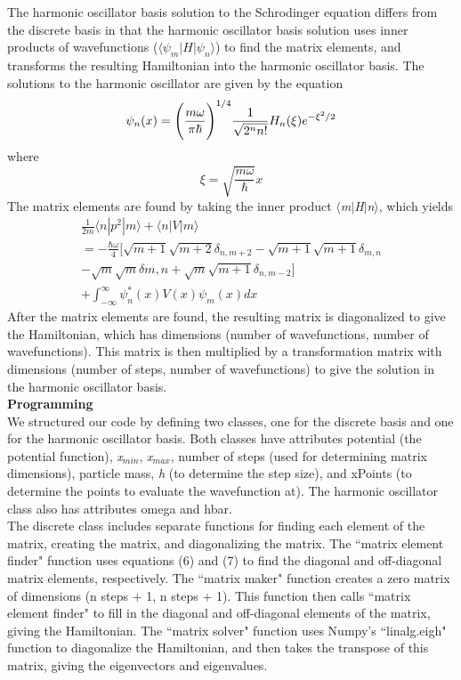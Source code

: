 \documentclass[%
 reprint,
 amsmath,amssymb,
 aps,
]{revtex4-1}
\begin{document}
\noindent The harmonic oscillator basis solution to the Schrodinger equation differs from the discrete basis in that the harmonic oscillator basis solution uses inner products of wavefunctions ($\langle\psi_m|H|\psi_n\rangle$) to find the matrix elements, and transforms the resulting Hamiltonian into the harmonic oscillator basis.  The solutions to the harmonic oscillator are given by the equation
\begin{equation}
\psi_n(x)=\Bigg{(}\frac{m\omega}{\pi\hbar}\Bigg{)}^{1/4}\frac{1}{\sqrt{2^n n!}}H_n(\xi)e^{-\xi^2/2}
\end{equation}
\noindent where
\begin{equation}
\xi=\sqrt{\frac{m\omega}{\hbar}}x
\end{equation}
The matrix elements are found by taking the inner product $\langle$\textit{m}$|$\textit{H}$|$\textit{n}$\rangle$, which yields
\begin{multline}
\frac{1}{2m}\langle n|p^2|m \rangle + \langle n|V|m \rangle \\
=-\frac{\hbar\omega}{4}[\sqrt{m+1}\sqrt{m+2}\delta_{n,m+2}-\sqrt{m+1}\sqrt{m+1}\delta_{m,n}\\
-\sqrt{m}\sqrt{m}\delta{m,n}+\sqrt{m}\sqrt{m+1}\delta_{n,m-2}] \\
+ \int_{-\infty}^{\infty}\psi_n^*(x)V(x)\psi_m(x)dx
\end{multline}
After the matrix elements are found, the resulting matrix is diagonalized to give the Hamiltonian, which has dimensions (number of wavefunctions, number of wavefunctions).  This matrix is then multiplied by a transformation matrix with dimensions (number of steps, number of wavefunctions) to give the solution in the harmonic oscillator basis.\\

\noindent \textbf{Programming}\\

\noindent We structured our code by defining two classes, one for the discrete basis and one for the harmonic oscillator basis.  Both classes have attributes potential (the potential function), \textit{x}$_{min}$, \textit{x}$_{max}$, number of steps (used for determining matrix dimensions), particle mass, \textit{h} (to determine the step size), and xPoints (to determine the points to evaluate the wavefunction at).  The harmonic oscillator class also has attributes omega and hbar.\\

\noindent The discrete class includes separate functions for finding each element of the matrix, creating the matrix, and diagonalizing the matrix.  The ``matrix element finder" function uses equations (6) and (7) to find the diagonal and off-diagonal matrix elements, respectively.  The ``matrix maker" function creates a zero matrix of dimensions (n steps + 1, n steps + 1).  This function then calls ``matrix element finder" to fill in the diagonal and off-diagonal elements of the matrix, giving the Hamiltonian.  The ``matrix solver" function uses Numpy's ``linalg.eigh" function to diagonalize the Hamiltonian, and then takes the transpose of this matrix, giving the eigenvectors and eigenvalues.\\
\end{document}
